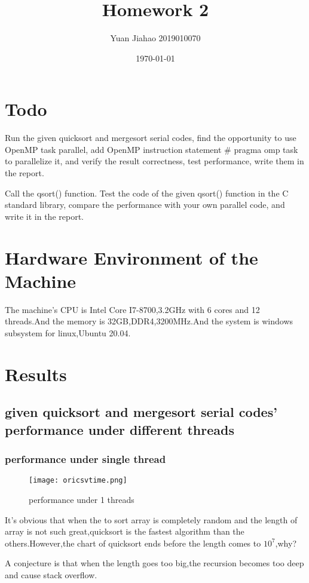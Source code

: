 \documentclass[11pt]{scrartcl} %
\title{	
	Homework 2
}
\author{Yuan Jiahao 2019010070} %
\date{\normalsize\today} %
\begin{document}
\maketitle %

\section{Todo}

Run the given quicksort and mergesort serial codes, find the opportunity to use OpenMP
task parallel, add OpenMP instruction statement \# pragma omp task to parallelize it, and verify
the result correctness, test performance, write them in the report.

Call the qsort() function. Test the code of the given qsort() function in the C standard
library, compare the performance with your own parallel code, and write it in the report.

\section{Hardware Environment of the Machine }
The machine's CPU is Intel Core I7-8700,3.2GHz with 6 cores and 12 threads.And the memory is 32GB,DDR4,3200MHz.And the system is windows subsystem for linux,Ubuntu 20.04.

\section{Results}
	\subsection{given quicksort and mergesort serial codes' performance under different threads }
	\subsubsection{performance under single thread }
	\begin{figure}[H]
		\centering
		\texttt{[image: oricsvtime.png]}
		\caption{performance under 1 threads}
		\label{f1}
	\end{figure}
	It's obvious that when the to sort array is completely random and the length of array is not such great,quicksort is the fastest algorithm than the others.However,the chart of quicksort ends before the length comes to $10^7$,why?

	A conjecture is that when the length goes too big,the recursion becomes too deep and cause stack overflow.
\end{document}
